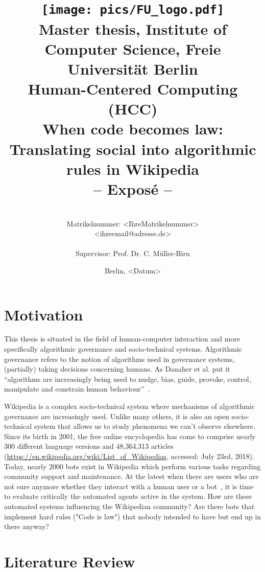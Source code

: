\documentclass[pdftex,a4paper,11pt]{scrartcl}
\title{\texttt{[image: pics/FU\_logo.pdf]}\\
{\small Master thesis, Institute of Computer Science, Freie Universität Berlin}\\
{\small Human-Centered Computing (HCC)}\\
[6ex]
{\LARGE When code becomes law: Translating social into algorithmic rules in Wikipedia}\\
{\normalsize-- Exposé --}}
\author{
{\emph{\normalsize<Ihr Vor- und Nachname>}}\\
{\normalsize Matrikelnummer: <IhreMatrikelnummer>}\\
{\normalsize <ihreemail@adresse.de>}\\\\
{\normalsize Supervisor: Prof. Dr. C. Müller-Birn}
}
\date{\normalsize Berlin, <Datum>}
\newcommand{\blankpage}{
\newpage
\thispagestyle{empty}
\mbox{}
\newpage
}
\begin{document}
\maketitle

\thispagestyle{empty}  %

\blankpage

\setcounter{page}{1} %

\section{Motivation}

This thesis is situated in the field of human-computer interaction and more specifically algorithmic governance and socio-technical systems.
Algorithmic governance refers to the notion of algorithms used in governance systems, (partially) taking decisions concerning humans.
As Danaher et al. put it ``algorithms are increasingly being used to nudge, bias, guide, provoke, control, manipulate and constrain human behaviour''~\cite{DanaherEtAl2017}.

Wikipedia is a complex socio-technical system where mechanisms of algorithmic governance are increasingly used.
Unlike many others, it is also an open socio-technical system that allows us to study phenomena we can't observe elsewhere.
Since its birth in 2001, the free online encyclopedia has come to comprise nearly 300 different language versions and 48,364,313 articles (\url{https://en.wikipedia.org/wiki/List_of_Wikipedias}, accessed: July 23rd, 2018).
Today, nearly 2000 bots exist in Wikipedia which perform various tasks regarding community support and maintenance.
At the latest when there are users who are not sure anymore whether they interact with a human user or a bot~\cite{FordGeiger2012}, it is time to evaluate critically the automated agents active in the system.
How are these automated systems influencing the Wikipedian community?
Are there bots that implement hard rules ("Code is law") that nobody intended to have but end up in there anyway?



\section{Literature Review}
\end{document}
